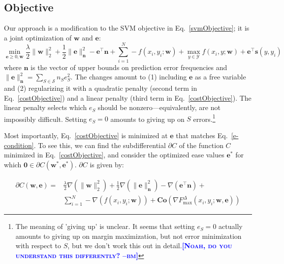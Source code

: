 \documentclass{article} %
\newcommand{\bmcomment}[1]{\textcolor{blue}{\textsc{\textbf{[#1 --bm]}}}}
\begin{document}
\subsection{Objective}

Our approach is a modification to the SVM objective in
Eq.~\ref{svmObjective}; it is a joint optimization of $\mathbf{w}$ and $\mathbf{e}$:
\begin{equation}
\label{costObjective}
\min_{\mathbf{e}\geq 0,\mathbf{w}} \frac{\lambda}{2}\|\mathbf{w}\|_2^2
+ \frac{1}{2} \|\mathbf{e}\|_{\mathbf{n}}^2 - \mathbf{e}^\top
\mathbf{n} + \sum_{i=1}^N -f(x_i,y_i; \mathbf{w})  + \max_{y \in
  \mathcal{Y}} f(x_i,y ; \mathbf{w}) + \mathbf{e}^\top \mathbf{s}(y, y_i)
\end{equation}
where $\mathbf{n}$ is the vector of upper bounds on prediction error
frequencies and $\|\mathbf{e}\|_{\mathbf{n}}^2 = \sum_{S \in
  \mathcal{S}} n_Se_S^2$.  The changes amount to (1) including
$\mathbf{e}$ as a free variable and (2) regularizing it with a quadratic
penalty (second term in Eq.~\ref{costObjective}) and a linear penalty
(third term in Eq.~\ref{costObjective}).  The linear penalty selects
which $e_S$ should be nonzero---equivalently, are not impossibly
difficult. Setting $e_S=0$ amounts to giving up on $S$
errors.\footnote{The meaning of 'giving up' is unclear.  It seems
that setting $e_S=0$ actually amounts to giving up on margin maximization,
but not error minimization with respect to $S$, but we don't work 
this out in detail.\bmcomment{Noah, do you understand
this differently?}}

Most importantly, Eq.~\ref{costObjective} is minimized at $\mathbf{e}$ 
that matches Eq.~\ref{e-condition}.  To see this, we can find the 
subdifferential $\partial C$ of the function $C$ minimized in
Eq.~\ref{costObjective}, and consider the optimized ease values 
$\mathbf{e}^*$
for which $\mathbf{0}\in \partial C(\mathbf{w}^*,\mathbf{e}^*)$.  
$\partial C$ is given by:

\begin{equation}
\label{subdifferential}
\begin{split}
\partial C(\mathbf{w},\mathbf{e}) = & \frac{\lambda}{2}\nabla (\|\mathbf{w}\|_2^2)
+\frac{1}{2}\nabla (\|\mathbf{e}\|^2_{\mathbf{n}})-\nabla (\mathbf{e}^\top \mathbf{n})
+ \\ 
& \sum_{i=1}^N -\nabla (f(x_i,y_i; \mathbf{w}))+ 
\mathbf{Co}(\nabla F^{\Delta}_{\max}(x_i,y_i;\mathbf{w},\mathbf{e}))
\end{split}
\end{equation}
\end{document}
